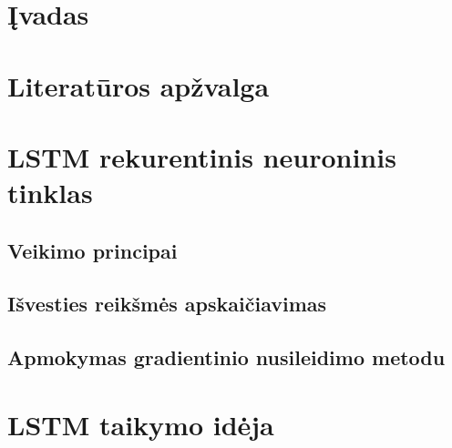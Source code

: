 \documentclass{ktu_phd_summary}
\begin{document}
\section{}


\tableofcontents
\clearpage

\listoffigures
\clearpage

\listoftables
\clearpage

\section*{Įvadas}


\clearpage

\section{Literatūros apžvalga}


\clearpage



\section{LSTM rekurentinis neuroninis tinklas}


\subsection{Veikimo principai}


\subsection{Išvesties reikšmės apskaičiavimas}


\subsection{Apmokymas gradientinio nusileidimo metodu}


\clearpage

\section{LSTM taikymo idėja}

\end{document}
